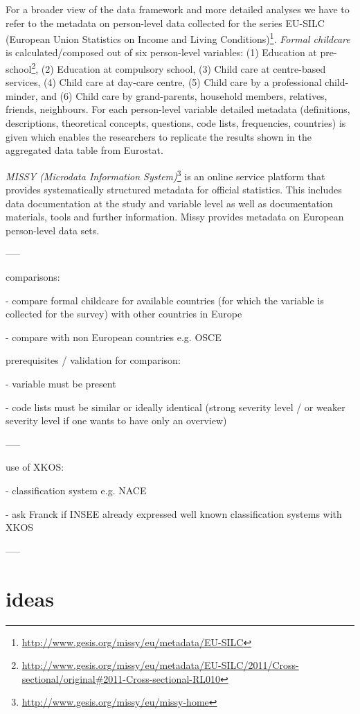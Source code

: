 \documentclass{llncs}
\begin{document}
For a broader view of the data framework and more detailed analyses we have to refer to the metadata on person-level data collected for the series EU-SILC (European Union Statistics on Income and Living Conditions)\footnote{\url{http://www.gesis.org/missy/eu/metadata/EU-SILC}}.
\emph{Formal childcare} is calculated/composed out of six person-level variables: 
(1) Education at pre-school\footnote{\url{http://www.gesis.org/missy/eu/metadata/EU-SILC/2011/Cross-sectional/original#2011-Cross-sectional-RL010}},
(2) Education at compulsory school,
(3) Child care at centre-based services,
(4) Child care at day-care centre,
(5) Child care by a professional child-minder, and
(6) Child care by grand-parents, household members, relatives, friends, neighbours.
For each person-level variable detailed metadata (definitions, descriptions, theoretical concepts, questions, code lists, frequencies, countries) is given which enables the researchers to replicate the results shown in the aggregated data table from Eurostat.



\emph{MISSY (Microdata Information System)}\footnote{\url{http://www.gesis.org/missy/eu/missy-home}} is an online service platform that provides systematically structured metadata for official statistics. This includes data documentation at the study and variable level as well as documentation materials, tools and further information. 
Missy provides metadata on European person-level data sets.

-----

comparisons:

- compare formal childcare for available countries (for which the variable is collected for the survey) with other countries in Europe

- compare with non European countries e.g. OSCE

prerequisites / validation for comparison:

- variable must be present

- code lists must be similar or ideally identical (strong severity level / or weaker severity level if one wants to have only an overview)

-----

use of XKOS:

- classification system e.g. NACE

- ask Franck if INSEE already expressed well known classification systems with XKOS

-----

\section{ideas}
\end{document}
